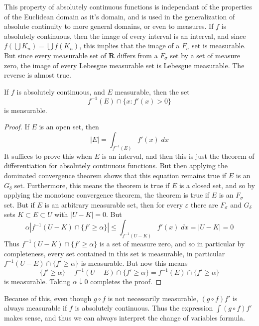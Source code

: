 This property of absolutely continuous functions is independant of the properties of the Euclidean domain as it's domain, and is used in the generalization of absolute continuity to more general domains, or even to measures. If $f$ is absolutely continuous, then the image of every interval is an interval, and since $f(\bigcup K_n) = \bigcup f(K_n)$, this implies that the image of a $F_\sigma$ set is measurable. But since every measurable set of $\mathbf{R}$ differs from a $F_\sigma$ set by a set of measure zero, the image of every Lebesgue measurable set is Lebesgue measurable. The reverse is almost true.

\begin{lemma}
  If $f$ is absolutely continuous, and $E$ measurable, then the set
  \[ f^{-1}(E) \cap \{ x : f'(x) > 0 \} \]
  is measurable.
\end{lemma}
\begin{proof}
  If $E$ is an open set, then
  \[ |E| = \int_{f^{-1}(E)} f'(x)\; dx \]
  It suffices to prove this when $E$ is an interval, and then this is just the theorem of differentiation for absolutely continuous functions. But then applying the dominated convergence theorem shows that this equation remains true if $E$ is an $G_\delta$ set. Furthermore, this means the theorem is true if $E$ is a closed set, and so by applying the monotone convergence theorem, the theorem is true if $E$ is an $F_\sigma$ set. But if $E$ is an arbitrary measurable set, then for every $\varepsilon$ there are $F_\sigma$ and $G_\delta$ sets $K \subset E \subset U$ with $|U - K| = 0$. But
  \[ \alpha|f^{-1}(U - K) \cap \{ f' \geq \alpha \}| \leq \int_{f^{-1}(U-K)} f'(x)\; dx = |U - K| = 0 \]
  Thus $f^{-1}(U-K) \cap \{ f' \geq \alpha \}$ is a set of measure zero, and so in particular by completeness, every set contained in this set is measurable, in particular $f^{-1}(U - E) \cap \{ f' \geq \alpha \}$ is measurable. But now this means
  \[ \{ f' \geq \alpha \} - f^{-1}(U-E) \cap \{ f' \geq \alpha \} = f^{-1}(E) \cap \{ f' \geq \alpha \} \]
  is measurable. Taking $\alpha \downarrow 0$ completes the proof.
\end{proof}

Because of this, even though $g \circ f$ is not necessarily measurable, $(g \circ f) f'$ is always measurable if $f$ is absolutely continuous. Thus the expression $\int (g \circ f) f'$ makes sense, and thus we can always interpret the change of variables formula.

